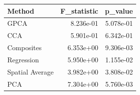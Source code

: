 \begin{tabular}{lrr}
\toprule
Method & F_statistic & p_value \\
\midrule
GPCA & 8.236e-01 & 5.078e-01 \\
CCA & 5.901e-01 & 6.342e-01 \\
Composites & 6.353e+00 & 9.306e-03 \\
Regression & 5.950e+00 & 1.155e-02 \\
Spatial Average & 3.982e+00 & 3.808e-02 \\
PCA & 7.304e+00 & 5.760e-03 \\
\bottomrule
\end{tabular}
